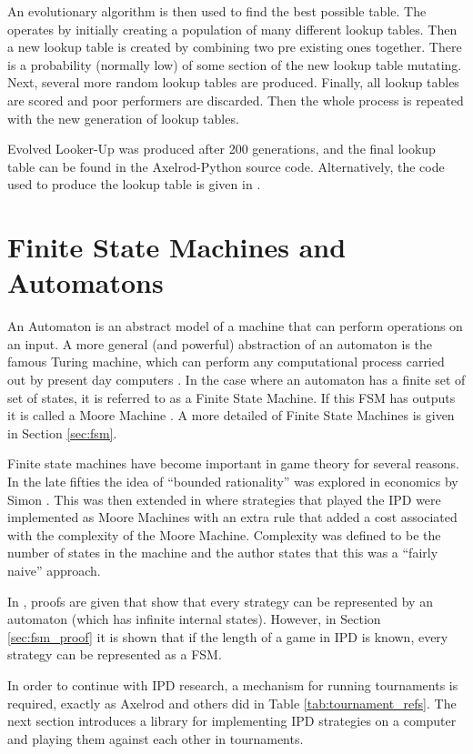 An evolutionary algorithm is then used to find the best possible table.
The operates by initially creating a population of many different lookup tables.
Then a new lookup table is created by combining two pre existing ones together.
There is a probability (normally low) of some section of the new lookup table mutating.
Next, several more random lookup tables are produced.
Finally, all lookup tables are scored and poor performers are discarded.
Then the whole process is repeated with the new generation of lookup tables.

Evolved Looker-Up was produced after 200 generations, and the final lookup table can be found in the Axelrod-Python source code.
Alternatively, the code used to produce the lookup table is given in \cite{axelrod-evolver}.


\section{Finite State Machines and Automatons}
An Automaton is an abstract model of a machine that can perform operations on an input.
A more general (and powerful) abstraction of an automaton is the famous Turing machine, which can perform any computational process carried out by present day computers \cite{Turing1936, Kandar2013}.
In the case where an automaton has a finite set of set of states, it is referred to as a Finite State Machine.
If this FSM has outputs it is called a Moore Machine \cite{Ndjountche2016}.
A more detailed of Finite State Machines is given in Section \ref{sec:fsm}.

Finite state machines have become important in game theory for several reasons.
In the late fifties the idea of ``bounded rationality'' was explored in economics by Simon \cite{Simon1972}.
This was then extended in \cite{Rubinstein1986} where strategies that played the IPD were implemented as Moore Machines with an extra rule that added a cost associated with the complexity of the Moore Machine.
Complexity was defined to be the number of states in the machine and the author states that this was a ``fairly naive'' approach.

In \cite{Kalai1986, Kalai1988}, proofs are given that show that every strategy can be represented by an automaton (which has infinite internal states).
However, in Section \ref{sec:fsm_proof} it is shown that if the length of a game in IPD is known, every strategy can be represented as a FSM.

In order to continue with IPD research, a mechanism for running tournaments is required, exactly as Axelrod and others did in Table \ref{tab:tournament_refs}.
The next section introduces a library for implementing IPD strategies on a computer and playing them against each other in tournaments.




